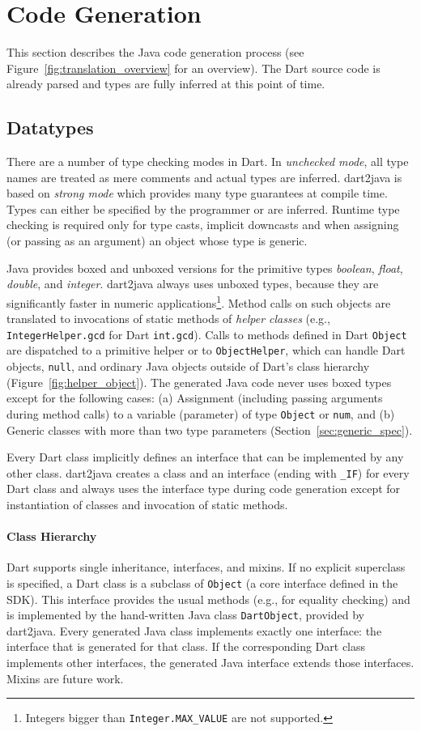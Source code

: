 \documentclass[sigplan]{acmart}
\begin{document}
\section{Code Generation}
This section describes the Java code generation process (see Figure~\ref{fig:translation_overview} for an overview). The Dart source code is already parsed and types are fully inferred at this point of time.

\subsection{Datatypes}
There are a number of type checking modes in Dart. In \emph{unchecked mode}, all type names are treated as mere comments and actual types are inferred. dart2java is based on \emph{strong mode} which provides many type guarantees at compile time. Types can either be specified by the programmer or are inferred. Runtime type checking is required only for type casts, implicit downcasts and when assigning (or passing as an argument) an object whose type is generic.

Java provides boxed and unboxed versions for the primitive types \emph{boolean}, \emph{float}, \emph{double}, and \emph{integer}. dart2java always uses unboxed types, because they are significantly faster in numeric applications\footnote{Integers bigger than \texttt{Integer.MAX\_VALUE} are not supported.}. Method calls on such objects are translated to invocations of static methods of \emph{helper classes} (e.g., \texttt{IntegerHelper.gcd} for Dart \texttt{int.gcd}).  Calls to methods defined in Dart \texttt{Object} are dispatched to a primitive helper or to \texttt{ObjectHelper}, which can handle Dart objects, \texttt{null}, and ordinary Java objects outside of Dart's class hierarchy (Figure~\ref{fig:helper_object}). The generated Java code never uses boxed types except for the following cases: (a) Assignment (including passing arguments during method calls) to a variable (parameter) of type \texttt{Object} or \texttt{num}, and (b) Generic classes with more than two type parameters (Section~\ref{sec:generic_spec}).

Every Dart class implicitly defines an interface that can be implemented by any other class. dart2java creates a class and an interface (ending with \texttt{\_IF}) for every Dart class and always uses the interface type during code generation except for instantiation of classes and invocation of static methods.

\paragraph{Class Hierarchy}
Dart supports single inheritance, interfaces, and mixins. If no explicit superclass is specified, a Dart class is a subclass of \texttt{Object} (a core interface defined in the SDK). This interface provides the usual methods (e.g., for equality checking) and is implemented by the hand-written Java class \texttt{DartObject}, provided by dart2java. Every generated Java class implements exactly one interface: the interface that is generated for that class. If the corresponding Dart class implements other interfaces, the generated Java interface extends those interfaces. Mixins are future work.
\end{document}
